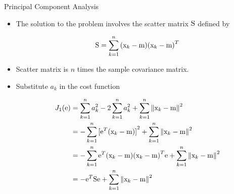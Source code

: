 \begin{frame}{Principal Component Analysis}
\begin{itemize}
\item The solution to the problem involves the scatter matrix ${\rm S}$ defined by
\begin{footnotesize}
\begin{equation}
{\rm S} = \sum\limits_{k = 1}^n {({{\rm x}_k} - {\rm m}){{({{\rm x}_k} - {\rm m})}^T}} \nonumber
\end{equation}
\end{footnotesize}
\item Scatter matrix is $n$ times the sample covariance matrix.
\item Substitute $a_k$ in the cost function
\begin{footnotesize}
\begin{align}
{J_1}({\rm e}) &= \sum\limits_{k = 1}^n {a_k^2}  - 2\sum\limits_{k = 1}^n {a_k^2}  + \sum\limits_{k = 1}^n {{{\left\| {{{\rm x}_k} - {\rm m}} \right\|}^2}}\nonumber\\
&=  - \sum\limits_{k = 1}^n {{{[{{\rm e}^T}({{\rm x}_k} - {\rm m})]}^2}}  + \sum\limits_{k = 1}^n {{{\left\| {{{\rm x}_k} - {\rm m}} \right\|}^2}} \nonumber\\
&=  - \sum\limits_{k = 1}^n {{{\rm e}^T}({{\rm x}_k} - {\rm m}){{({{\rm x}_k} - {\rm m})}^T}{\rm e}}  + \sum\limits_{k = 1}^n {{{\left\| {{{\rm x}_k} - {\rm m}} \right\|}^2}} \nonumber\\
& =  - {{\rm e}^T}{\rm S}{\rm e} + \sum\limits_{k = 1}^n {{{\left\| {{{\rm x}_k} - {\rm m}} \right\|}^2}} \nonumber
\end{align}
\end{footnotesize}
\end{itemize}
\end{frame}

